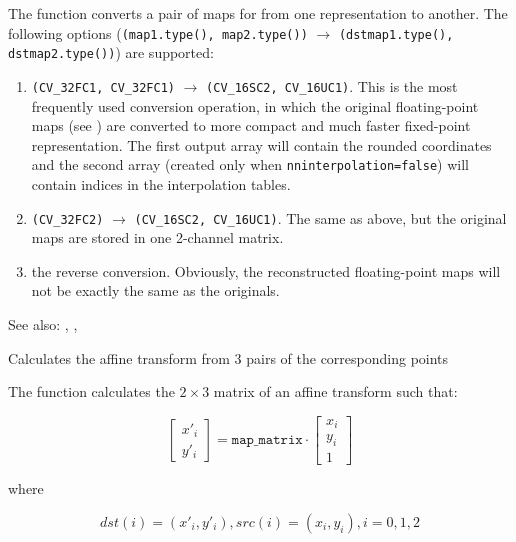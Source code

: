 The function converts a pair of maps for  from one representation to another. The following options (\texttt{(map1.type(), map2.type())} $\rightarrow$ \texttt{(dstmap1.type(), dstmap2.type())}) are supported:
\begin{enumerate}
    \item \texttt{(CV\_32FC1, CV\_32FC1)} $\rightarrow$ \texttt{(CV\_16SC2, CV\_16UC1)}. This is the most frequently used conversion operation, in which the original floating-point maps (see ) are converted to more compact and much faster fixed-point representation. The first output array will contain the rounded coordinates and the second array (created only when \texttt{nninterpolation=false}) will contain indices in the interpolation tables.   
    \item \texttt{(CV\_32FC2)} $\rightarrow$ \texttt{(CV\_16SC2, CV\_16UC1)}. The same as above, but the original maps are stored in one 2-channel matrix.
    \item the reverse conversion. Obviously, the reconstructed floating-point maps will not be exactly the same as the originals.
\end{enumerate} 

See also: , , 

Calculates the affine transform from 3 pairs of the corresponding points


\begin{description}
\end{description}

The function calculates the $2 \times 3$ matrix of an affine transform such that:

\[
\begin{bmatrix}
x'_i\\
y'_i
\end{bmatrix}
=
\texttt{map\_matrix}
\cdot
\begin{bmatrix}
x_i\\
y_i\\
1
\end{bmatrix}
\]

where

\[
dst(i)=(x'_i,y'_i),
src(i)=(x_i, y_i),
i=0,1,2
\]

